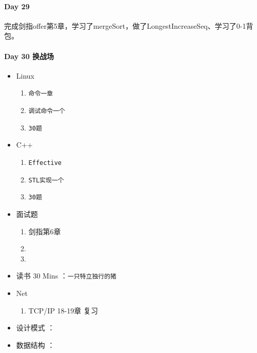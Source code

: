 \documentclass[UTF8,a4paper,8pt]{ctexart}
\begin{document}
 	 \paragraph{Day 29      \quad     } 
 	 
	 	 完成剑指offer第5章，学习了mergeSort，做了LongestIncreaseSeq、学习了0-1背包。
	 	   
 	 \paragraph{Day 30  换战场    \quad     }
	 	 \begin{itemize}[itemindent = 1em]
	 	 	\renewcommand\labelitemi{\makebox[0pt][l]{$\square$}\hspace{1em}} 
	 	 	\renewcommand\labelitemi{\makebox[0pt][l]{$\square$}\raisebox{.15ex}{\hspace{0.1em}$\checkmark$}}	 	
	 	 	\item   Linux 
	 	 	\begin{enumerate}
	 	 		\item \verb|命令一章|
	 	 		\item \verb|调试命令一个|
	 	 		\item \verb|30题|
	 	 	\end{enumerate}
	 	 	\item   C++   
	 	 	\begin{enumerate}
	 	 		\item \verb|Effective|
	 	 		\item \verb|STL实现一个|
	 	 		\item \verb|30题|
	 	 	\end{enumerate}
	 	 	
	 	 	\item  面试题
	 	 	\begin{enumerate}
	 	 		\item 剑指第6章
	 	 		\item 
	 	 		\item 
	 	 	\end{enumerate}
	 	 	
	 	 	\item   读书  30 Mins	：\verb|一只特立独行的猪|
	 	 	\item   Net
	 	 	\begin{enumerate}
	 	 		\item TCP/IP  18-19章 复习
	 	 	\end{enumerate}	
	 	 	
	 	 	\renewcommand\labelitemi{\makebox[0pt][l]{$\square$}\hspace{1em}}
	 	 	\item   设计模式 ：\verb|| 
	 	 	\item   数据结构 ：\verb|| 
	 	 \end{itemize}
\end{document}
